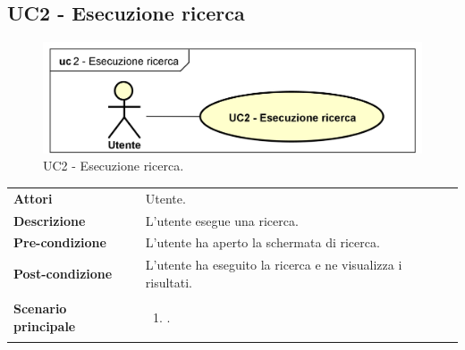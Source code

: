 {\subsection*{UC2 - Esecuzione ricerca}
\label{sec:UC2}  
\begin{figure}[H] 
	\centering 
	\includegraphics[scale=0.35]{"immagini/usecase/UC2 - Esecuzione ricerca"} 
	\caption{UC2 - Esecuzione ricerca.}
\end{figure}
\def\arraystretch{1.3}
\begin{tabularx}{\textwidth}{l|p{}}
	\rowcolor{I} \multicolumn{2}{c}{\color{white}\textbf{UC2 - Esecuzione ricerca}} \\
	\toprule
	\endhead
	\textbf{Attori} & Utente.\\
	\textbf{Descrizione} & L'utente esegue una ricerca.\\
	\textbf{Pre-condizione} & L'utente ha aperto la schermata di ricerca.\\
	\textbf{Post-condizione} & L'utente ha eseguito la ricerca e ne visualizza i risultati.\\
	\textbf{Scenario principale} & \vspace{-1.2em}
	\begin{enumerate}[leftmargin=*,noitemsep,nosep]
		\item \nameref{sec:UC2}.
	\end{enumerate}\\
\end{tabularx}
}